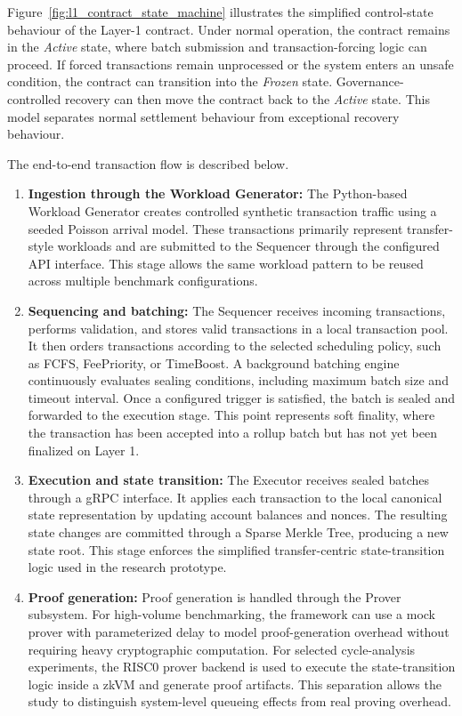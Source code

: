 Figure~\ref{fig:l1_contract_state_machine} illustrates the simplified control-state behaviour of the Layer-1 contract. Under normal operation, the contract remains in the \textit{Active} state, where batch submission and transaction-forcing logic can proceed. If forced transactions remain unprocessed or the system enters an unsafe condition, the contract can transition into the \textit{Frozen} state. Governance-controlled recovery can then move the contract back to the \textit{Active} state. This model separates normal settlement behaviour from exceptional recovery behaviour.

The end-to-end transaction flow is described below.

\begin{enumerate}
    \item \textbf{Ingestion through the Workload Generator:}
    The Python-based Workload Generator creates controlled synthetic transaction traffic using a seeded Poisson arrival model. These transactions primarily represent transfer-style workloads and are submitted to the Sequencer through the configured API interface. This stage allows the same workload pattern to be reused across multiple benchmark configurations.

    \item \textbf{Sequencing and batching:}
    The Sequencer receives incoming transactions, performs validation, and stores valid transactions in a local transaction pool. It then orders transactions according to the selected scheduling policy, such as FCFS, FeePriority, or TimeBoost. A background batching engine continuously evaluates sealing conditions, including maximum batch size and timeout interval. Once a configured trigger is satisfied, the batch is sealed and forwarded to the execution stage. This point represents soft finality, where the transaction has been accepted into a rollup batch but has not yet been finalized on Layer 1.

    \item \textbf{Execution and state transition:}
    The Executor receives sealed batches through a gRPC interface. It applies each transaction to the local canonical state representation by updating account balances and nonces. The resulting state changes are committed through a Sparse Merkle Tree, producing a new state root. This stage enforces the simplified transfer-centric state-transition logic used in the research prototype.

    \item \textbf{Proof generation:}
    Proof generation is handled through the Prover subsystem. For high-volume benchmarking, the framework can use a mock prover with parameterized delay to model proof-generation overhead without requiring heavy cryptographic computation. For selected cycle-analysis experiments, the RISC0 prover backend is used to execute the state-transition logic inside a zkVM and generate proof artifacts. This separation allows the study to distinguish system-level queueing effects from real proving overhead.


\end{enumerate}

